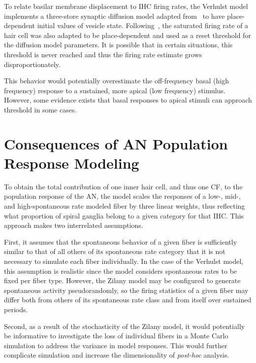To relate basilar membrane displacement to IHC firing rates, the Verhulst model implements a three-store synaptic diffusion model adapted from~\cite{Westerman1988Diffusion} to have place-dependent initial values of vesicle state.   Following~\cite{Liberman1978AuditoryNerve}, the saturated firing rate of a hair cell was also adapted to be place-dependent and used as a reset threshold for the diffusion model parameters.  It is possible that in certain situations, this threshold is never reached and thus the firing rate estimate grows disproportionately.  

This behavior would potentially overestimate the off-frequency basal (high frequency) response to a sustained, more apical (low frequency) stimulus.  However, some evidence exists \citep{Kiang1974Tails,Yates1990Basilar} that basal responses to apical stimuli can approach threshold in some cases. 

\section{Consequences of AN Population Response Modeling} %
\label{sec:consequences_of_percentage_weighting_degradation_for_synaptopathy}
To obtain the total contribution of one inner hair cell, and thus one CF, to the population response of the AN, the model scales the responses of a low-, mid-, and high-spontaneous rate modeled fiber by three linear weights, thus reflecting what proportion of spiral ganglia belong to a given category for that IHC.  This approach makes two interrelated assumptions.  

First, it assumes that the spontaneous behavior of a given fiber is sufficiently similar to that of all others of its spontaneous rate category that it is not necessary to simulate each fiber individually.  In the case of the Verhulst model, this assumption is realistic since the model considers spontaneous rates to be fixed per fiber type.  However, the Zilany model may be configured to generate spontaneous activity pseudorandomly, so the firing statistics of a given fiber may differ both from others of its spontaneous rate class and from itself over sustained periods.  

Second, as a result of the stochasticity of the Zilany model, it would potentially be informative to investigate the loss of individual fibers in a Monte Carlo simulation to address the variance in model responses.  This would further complicate simulation and increase the dimensionality of \emph{post-hoc} analysis. 


